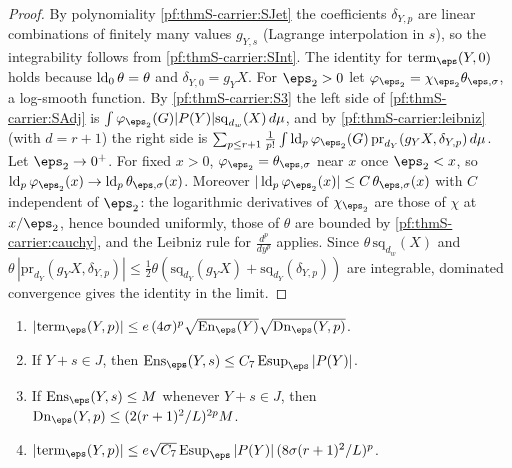 \begin{proof}
By polynomiality \ref{pf:thmS-carrier:SJet} the coefficients $\delta_{Y,p}$ are linear combinations of finitely many values
$g_{Y,s}$ (Lagrange interpolation in $s$), so the integrability follows from \ref{pf:thmS-carrier:SInt}. The identity for
$\mathrm{term}_\eps(Y,0)$ holds because $\operatorname{ld}_0\theta=\theta$ and $\delta_{Y,0}=g_YX$. For $\eps_2>0$ let
$\varphi_{\eps_2}=\chi_{\eps_2}\theta_{\eps,\sigma}$, a log-smooth function. By \ref{pf:thmS-carrier:S3} the left side of
\ref{pf:thmS-carrier:SAdj} is $\int\varphi_{\eps_2}(G)|P(Y)|\mathrm{sq}_{d_w}(X)\,d\mu$, and by \cref{pf:thmS-carrier:leibniz}
(with $d=r+1$) the right side is $\sum_{p\le r+1}\frac1{p!}\int\thmScarrierld_p\varphi_{\eps_2}(G)\,\mathrm{pr}_{d_Y}(g_YX,
\delta_{Y,p})\,d\mu$. Let $\eps_2\to0^+$. For fixed $x>0$, $\varphi_{\eps_2}=\theta_{\eps,\sigma}$ near $x$ once $\eps_2<x$, so
$\thmScarrierld_p\varphi_{\eps_2}(x)\to\thmScarrierld_p\theta_{\eps,\sigma}(x)$. Moreover
$|\thmScarrierld_p\varphi_{\eps_2}(x)|\le C\,\theta_{\eps,\sigma}(x)$ with $C$ independent of $\eps_2$: the logarithmic
derivatives of $\chi_{\eps_2}$ are those of $\chi$ at $x/\eps_2$, hence bounded uniformly, those of $\theta$ are bounded by
\cref{pf:thmS-carrier:cauchy}, and the Leibniz rule for $\frac{d^p}{dy^p}$ applies. Since $\theta\,\mathrm{sq}_{d_w}(X)$ and
$\theta\,|\mathrm{pr}_{d_Y}(g_YX,\delta_{Y,p})|\le\frac12\theta(\mathrm{sq}_{d_Y}(g_YX)+\mathrm{sq}_{d_Y}(\delta_{Y,p}))$ are
integrable, dominated convergence gives the identity in the limit.
\end{proof}

\begin{lemma}\label{pf:thmS-carrier:terms}
\begin{enumerate}
\item $|\mathrm{term}_\eps(Y,p)|\le e\,(4\sigma)^p\sqrt{\mathrm{En}_\eps(Y)}\sqrt{\mathrm{Dn}_\eps(Y,p)}$.
\item If $Y+s\in J$, then $\mathrm{Ens}_\eps(Y,s)\le C_7\,\mathrm{Esup}_\eps\,|P(Y)|$.
\item If $\mathrm{Ens}_\eps(Y,s)\le M$ whenever $Y+s\in J$, then $\mathrm{Dn}_\eps(Y,p)\le(2(r+1)^2/L)^{2p}M$.
\item $|\mathrm{term}_\eps(Y,p)|\le e\sqrt{C_7}\,\mathrm{Esup}_\eps\,|P(Y)|\,(8\sigma(r+1)^2/L)^p$.
\end{enumerate}
\end{lemma}

